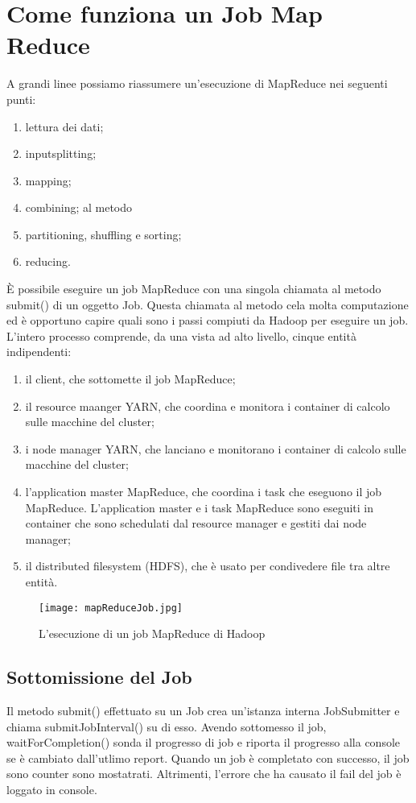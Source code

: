 \section{Come funziona un Job Map Reduce}
A grandi linee possiamo riassumere un'esecuzione di MapReduce nei seguenti punti:
\begin{enumerate}
  \item lettura dei dati;
  \item inputsplitting;
  \item mapping;
  \item combining; al metodo 
  \item partitioning, shuffling e sorting;
  \item reducing.
\end{enumerate}
È possibile eseguire un job MapReduce con una singola chiamata al metodo submit() di un oggetto Job. Questa chiamata al metodo cela molta computazione ed è opportuno capire quali sono i passi compiuti da Hadoop  per eseguire un job. \\
L'intero processo comprende, da una vista ad alto livello, cinque entità indipendenti:
\begin{enumerate}
  \item il client, che sottomette il job MapReduce;
  \item il resource maanger YARN, che coordina e monitora i container di calcolo sulle macchine del cluster;
  \item i node manager YARN, che lanciano e monitorano i container di calcolo sulle macchine del cluster;
  \item l'application master MapReduce, che coordina i task che eseguono il job MapReduce. L'application master e i task MapReduce sono eseguiti in container che sono schedulati dal resource manager e gestiti dai node manager;
  \item il distributed filesystem (HDFS), che è usato per condivedere file tra altre entità.
\end{enumerate}
\begin{figure}
  \begin{center}
    \texttt{[image: mapReduceJob.jpg]}
    \caption{L'esecuzione di un job MapReduce di Hadoop}
    \label{fig:job}
  \end{center}
\end{figure}
\subsection{Sottomissione del Job}
Il metodo submit() effettuato su un Job crea un'istanza interna JobSubmitter e chiama submitJobInterval() su di esso. Avendo sottomesso il job, waitForCompletion() sonda il progresso di job e riporta il progresso alla console se è cambiato dall'utlimo report. Quando un job è completato con successo, il job sono counter sono mostatrati. Altrimenti, l'errore che ha causato il fail del job è loggato in console.
